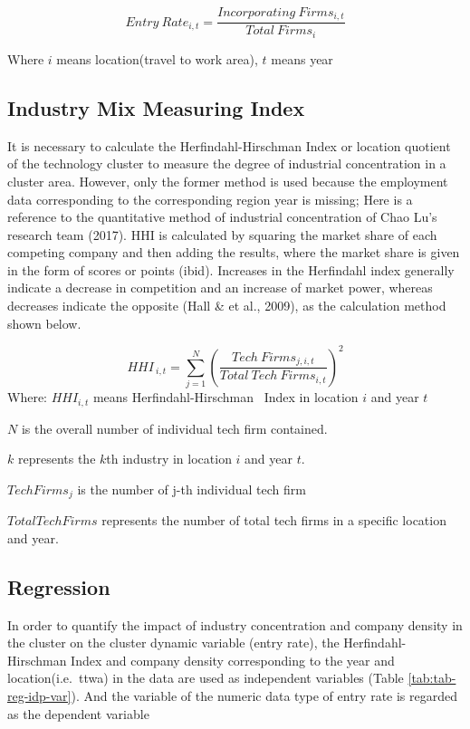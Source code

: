 \documentclass[
  12pt,
  oneside]{book}
\begin{document}
\[ 
Entry\ Rate_{i,t} = \frac{Incorporating\ Firms_{i,t}}{Total\  Firms_{i}} 
\]

Where \(i\) means location(travel to work area), \(t\) means year

\hypertarget{industry-mix-measuring-index}{%
\subsection{Industry Mix Measuring Index}\label{industry-mix-measuring-index}}

It is necessary to calculate the Herfindahl-Hirschman Index or location quotient of the technology cluster to measure the degree of industrial concentration in a cluster area. However, only the former method is used because the employment data corresponding to the corresponding region year is missing; Here is a reference to the quantitative method of industrial concentration of Chao Lu's research team (2017). HHI is calculated by squaring the market share of each competing company and then adding the results, where the market share is given in the form of scores or points (ibid). Increases in the Herfindahl index generally indicate a decrease in competition and an increase of market power, whereas decreases indicate the opposite (Hall \& et al., 2009), as the calculation method shown below.

\[
HHI_{\ i,t} = \sum_{j=1}^N (\frac{Tech\ Firms_{j,i,t}}{Total\ Tech\ Firms_{i,t}})^2 
\]
Where:
\(HHI_{i,t}\) means Herfindahl-Hirschman ~Index in location \(i\) and year \(t\)

\(N\) is the overall number of individual tech firm contained.

\(k\) represents the \(k\)th industry in location \(i\) and year \(t\).

\(Tech Firms_j\) is the number of j-th individual tech firm

\(Total Tech Firms\) represents the number of total tech firms in a specific location and year.

\hypertarget{regression}{%
\subsection{Regression}\label{regression}}

In order to quantify the impact of industry concentration and company density in the cluster on the cluster dynamic variable (entry rate), the Herfindahl-Hirschman Index and company density corresponding to the year and location(i.e.~ttwa) in the data are used as independent variables (Table \ref{tab:tab-reg-idp-var}). And the variable of the numeric data type of entry rate is regarded as the dependent variable
\end{document}
